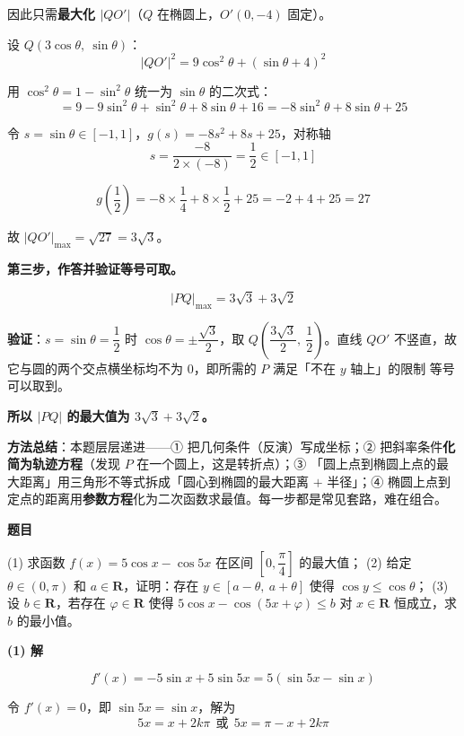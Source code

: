 因此只需\textbf{最大化 $|QO'|$}（$Q$ 在椭圆上，$O'(0,-4)$ 固定）。

设 $Q\left(3\cos\theta,\ \sin\theta\right)$：
\[|QO'|^2=9\cos^2\theta+(\sin\theta+4)^2\]

用 $\cos^2\theta=1-\sin^2\theta$ 统一为 $\sin\theta$ 的二次式：
\[=9-9\sin^2\theta+\sin^2\theta+8\sin\theta+16=-8\sin^2\theta+8\sin\theta+25\]

令 $s=\sin\theta\in[-1,1]$，$g(s)=-8s^2+8s+25$，对称轴
\[s=\frac{-8}{2\times(-8)}=\frac12\in[-1,1]\]

\[g\left(\frac12\right)=-8\times\frac14+8\times\frac12+25=-2+4+25=27\]

故 $|QO'|_{\max}=\sqrt{27}=3\sqrt3$。

\textbf{第三步，作答并验证等号可取。}

\[|PQ|_{\max}=3\sqrt3+3\sqrt2\]

\textbf{验证}：$s=\sin\theta=\dfrac12$ 时 $\cos\theta=\pm\dfrac{\sqrt3}{2}$，取 $Q\left(\dfrac{3\sqrt3}{2},\ \dfrac12\right)$。直线 $QO'$ 不竖直，故它与圆的两个交点横坐标均不为 $0$，即所需的 $P$ 满足「不在 $y$ 轴上」的限制  等号可以取到。

\textbf{所以 $|PQ|$ 的最大值为 $3\sqrt3+3\sqrt2$。}

\begin{gktip}
\textbf{方法总结}：本题层层递进——① 把几何条件（反演）写成坐标；② 把斜率条件\textbf{化简为轨迹方程}（发现 $P$ 在一个圆上，这是转折点）；③ 「圆上点到椭圆上点的最大距离」用三角形不等式拆成「圆心到椭圆的最大距离 $+$ 半径」；④ 椭圆上点到定点的距离用\textbf{参数方程}化为二次函数求最值。每一步都是常见套路，难在组合。
\end{gktip}

\par\medskip


\textbf{题目}

  (1) 求函数 $f(x)=5\cos x-\cos5x$ 在区间 $\left[0,\dfrac\pi4\right]$ 的最大值；
  (2) 给定 $\theta\in(0,\pi)$ 和 $a\in\mathbf R$，证明：存在 $y\in[a-\theta,\ a+\theta]$ 使得 $\cos y\le\cos\theta$；
  (3) 设 $b\in\mathbf R$，若存在 $\varphi\in\mathbf R$ 使得 $5\cos x-\cos(5x+\varphi)\le b$ 对 $x\in\mathbf R$ 恒成立，求 $b$ 的最小值。

\par\medskip

\textbf{(1) 解}

\[f'(x)=-5\sin x+5\sin5x=5\left(\sin5x-\sin x\right)\]

令 $f'(x)=0$，即 $\sin5x=\sin x$，解为
\[5x=x+2k\pi\ \ \text{或}\ \ 5x=\pi-x+2k\pi\]

